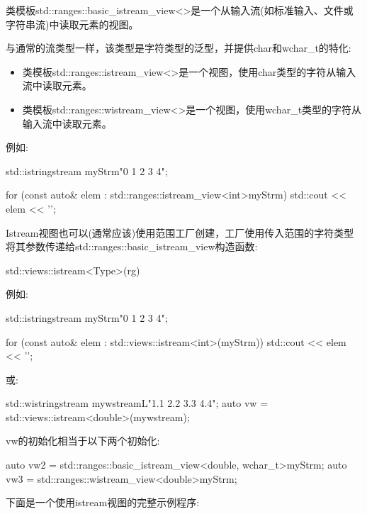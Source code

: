 类模板std::ranges::basic\_istream\_view<>是一个从输入流(如标准输入、文件或字符串流)中读取元素的视图。

与通常的流类型一样，该类型是字符类型的泛型，并提供char和wchar\_t的特化:

\begin{itemize}
\item
类模板std::ranges::istream\_view<>是一个视图，使用char类型的字符从输入流中读取元素。

\item
类模板std::ranges::wistream\_view<>是一个视图，使用wchar\_t类型的字符从输入流中读取元素。
\end{itemize}

例如:

\begin{cpp}
std::istringstream myStrm{"0 1 2 3 4"};

for (const auto& elem : std::ranges::istream_view<int>{myStrm}) {
	std::cout << elem << '\n';
}
\end{cpp}


Istream视图也可以(通常应该)使用范围工厂创建，工厂使用传入范围的字符类型将其参数传递给std::ranges::basic\_istream\_view构造函数:

\begin{cpp}
std::views::istream<Type>(rg)
\end{cpp}

例如:

\begin{cpp}
std::istringstream myStrm{"0 1 2 3 4"};

for (const auto& elem : std::views::istream<int>(myStrm)) {
	std::cout << elem << '\n';
}
\end{cpp}

或:

\begin{cpp}
std::wistringstream mywstream{L"1.1 2.2 3.3 4.4"};
auto vw = std::views::istream<double>(mywstream);
\end{cpp}

vw的初始化相当于以下两个初始化:

\begin{cpp}
auto vw2 = std::ranges::basic_istream_view<double, wchar_t>{myStrm};
auto vw3 = std::ranges::wistream_view<double>{myStrm};
\end{cpp}

下面是一个使用istream视图的完整示例程序:


